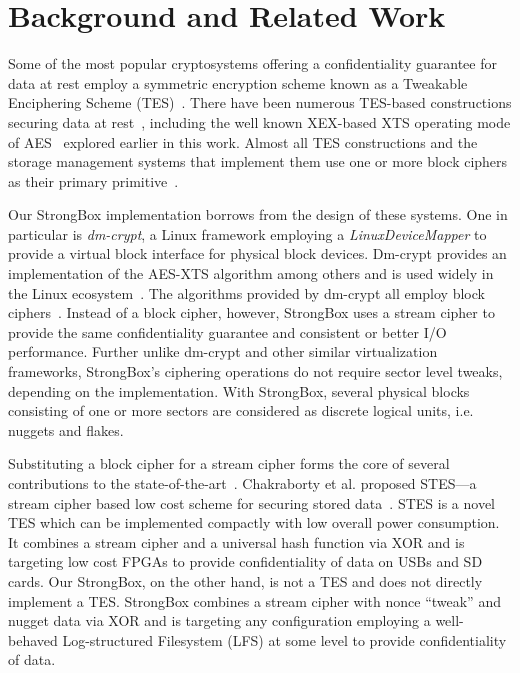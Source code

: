 \chapter{Background and Related Work} \label{chp:related}

Some of the most popular cryptosystems offering a confidentiality
guarantee for data at rest employ a symmetric encryption scheme known
as a Tweakable Enciphering Scheme (TES)~\cite{STES,XEX}. There have
been numerous TES-based constructions securing data at
rest~\cite{STES,CMC,HCTR}, including the well known XEX-based XTS
operating mode of AES~\cite{XTS} explored earlier in this work. Almost
all TES constructions and the storage management systems that
implement them use one or more block ciphers as their primary
primitive~\cite{TES-From-Stream-Cipher,STES}.

Our StrongBox implementation borrows from the design of these systems. One in
particular is \emph{dm-crypt}, a Linux framework employing a
\textit{LinuxDeviceMapper} to provide a virtual block interface for physical
block devices. Dm-crypt provides an implementation of the AES-XTS algorithm among
others and is used widely in the Linux ecosystem~\cite{DmC-Android, dmcrypt}.
The algorithms provided by dm-crypt all employ block ciphers~\cite{dmcrypt}.
Instead of a block cipher, however, StrongBox uses a stream cipher to provide
the same confidentiality guarantee and consistent or better I/O performance.
Further unlike dm-crypt and other similar virtualization frameworks, StrongBox's
ciphering operations do not require sector level tweaks, depending on the
implementation. With StrongBox, several physical blocks consisting of one or
more sectors are considered as discrete logical units, i.e. nuggets and flakes.

Substituting a block cipher for a stream cipher forms the core of several
contributions to the state-of-the-art~\cite{STES, TES-From-Stream-Cipher}.
Chakraborty et al. proposed STES---a stream cipher based low cost scheme for
securing stored data~\cite{STES}. STES is a novel TES which can be implemented
compactly with low overall power consumption. It combines a stream cipher and a
universal hash function via XOR and is targeting low cost FPGAs to provide
confidentiality of data on USBs and SD cards. Our StrongBox, on the other hand,
is not a TES and does not directly implement a TES. StrongBox combines a stream
cipher with nonce ``tweak'' and nugget data via XOR and is targeting any
configuration employing a well-behaved Log-structured Filesystem (LFS) at some
level to provide confidentiality of data.

